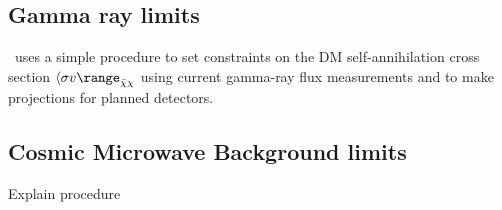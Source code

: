% 
% 
% 

\subsection{Gamma ray limits}

\hazma\ uses a simple procedure to set constraints on the DM self-annihilation cross section $\svann$ using current gamma-ray flux measurements and to make projections for planned detectors. 

\subsection{Cosmic Microwave Background limits}

Explain procedure

